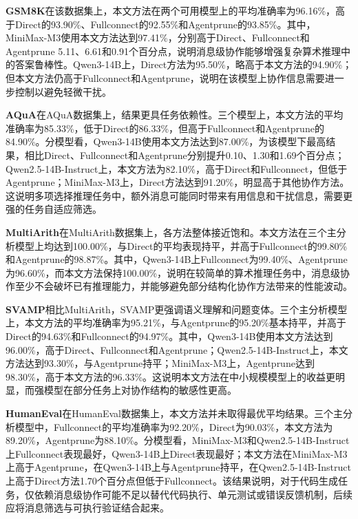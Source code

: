 \noindent\textbf{GSM8K}在该数据集上，本文方法在两个可用模型上的平均准确率为96.16\%，高于Direct的93.90\%、Fullconnect的92.55\%和Agentprune的93.85\%。其中，MiniMax-M3使用本文方法达到97.41\%，分别高于Direct、Fullconnect和Agentprune 5.11、6.61和0.91个百分点，说明消息级协作能够增强复杂算术推理中的答案鲁棒性。Qwen3-14B上，Direct方法为95.50\%，略高于本文方法的94.90\%；但本文方法仍高于Fullconnect和Agentprune，说明在该模型上协作信息需要进一步控制以避免轻微干扰。

\noindent\textbf{AQuA}在AQuA数据集上，结果更具任务依赖性。三个模型上，本文方法的平均准确率为85.33\%，低于Direct的86.33\%，但高于Fullconnect和Agentprune的84.90\%。分模型看，Qwen3-14B使用本文方法达到87.00\%，为该模型下最高结果，相比Direct、Fullconnect和Agentprune分别提升0.10、1.30和1.69个百分点；Qwen2.5-14B-Instruct上，本文方法为82.10\%，高于Direct和Fullconnect，但低于Agentprune；MiniMax-M3上，Direct方法达到91.20\%，明显高于其他协作方法。这说明多项选择推理任务中，额外消息可能同时带来有用信息和干扰信息，需要更强的任务自适应筛选。

\noindent\textbf{MultiArith}在MultiArith数据集上，各方法整体接近饱和。本文方法在三个主分析模型上均达到100.00\%，与Direct的平均表现持平，并高于Fullconnect的99.80\%和Agentprune的98.87\%。其中，Qwen3-14B上Fullconnect为99.40\%、Agentprune为96.60\%，而本文方法保持100.00\%，说明在较简单的算术推理任务中，消息级协作至少不会破坏已有推理能力，并能够避免部分结构化协作方法带来的性能波动。

\noindent\textbf{SVAMP}相比MultiArith，SVAMP更强调语义理解和问题变体。三个主分析模型上，本文方法的平均准确率为95.21\%，与Agentprune的95.20\%基本持平，并高于Direct的94.63\%和Fullconnect的94.97\%。其中，Qwen3-14B使用本文方法达到96.00\%，高于Direct、Fullconnect和Agentprune；Qwen2.5-14B-Instruct上，本文方法达到93.30\%，与Agentprune持平；MiniMax-M3上，Agentprune达到98.30\%，高于本文方法的96.33\%。这说明本文方法在中小规模模型上的收益更明显，而强模型在部分任务上对协作结构的敏感性更高。

\noindent\textbf{HumanEval}在HumanEval数据集上，本文方法并未取得最优平均结果。三个主分析模型中，Fullconnect的平均准确率为92.20\%，Direct为90.03\%，本文方法为89.20\%，Agentprune为88.10\%。分模型看，MiniMax-M3和Qwen2.5-14B-Instruct上Fullconnect表现最好，Qwen3-14B上Direct表现最好；本文方法在MiniMax-M3上高于Agentprune，在Qwen3-14B上与Agentprune持平，在Qwen2.5-14B-Instruct上高于Direct方法1.70个百分点但低于Fullconnect。该结果说明，对于代码生成任务，仅依赖消息级协作可能不足以替代代码执行、单元测试或错误反馈机制，后续应将消息筛选与可执行验证结合起来。

